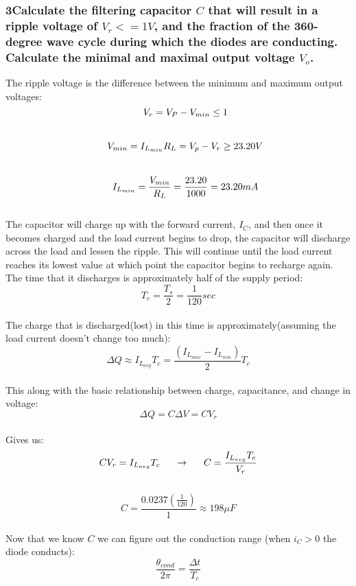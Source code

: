 \documentclass[]{article}
\begin{document}
{	\subsubsection*{3\indent Calculate the filtering capacitor $C$ that will result in a ripple voltage of $V_r <= 1V$, and the fraction of the 360-degree wave cycle during which the diodes are conducting. Calculate the minimal and maximal output voltage $V_o$.}
	{
		The ripple voltage is the difference between the minimum and maximum output voltages:
		\begin{equation} 
			\indent V_r = V_P - V_{min} \le  1
		\end{equation}
		\\
		\begin{equation} 
			\indent V_{min} = I_{L_{min}}R_L = V_p - V_r \ge 23.20V
		\end{equation}
		\\
		\begin{equation} 
			\indent I_{L_{min}} = \frac{V_{min}}{R_L} = \frac{23.20}{1000} = 23.20mA
		\end{equation}
		\\
		The capacitor will charge up with the forward current, $I_C$, and then once it becomes charged and the load current begins to drop, the capacitor will discharge across the load and lessen the ripple. This will continue until the load current reaches its lowest value at which point the capacitor begins to recharge again. The time that it discharges is approximately half of the supply period:
		\begin{equation}
			T_c = \frac{T_s}{2} = \frac{1}{120}sec
		\end{equation}
		\\
		The charge that is discharged(lost) in this time is approximately(assuming the load current doesn't change too much):
			\[ \Delta Q \approx I_{L_{avg}}T_c = \frac{(I_{L_{max}}-I_{L_{min}})}{2}T_c \]
		\\
		This along with the basic relationship between charge, capacitance, and change in voltage:
			\[ \Delta Q = C \Delta V = CV_r \]
		\\
		Gives us:
			\[ CV_r = I_{L_{avg}}T_c \indent\rightarrow\indent C = \frac{I_{L_{avg}}T_c}{V_r} \]
			\\
			\[ C = \frac{0.0237(\frac{1}{120})}{1} \approx 198\mu F \]
		\\
		Now that we know $C$ we can figure out the conduction range (when $i_C > 0$ the diode conducts):
			\[ \frac{\theta_{cond}}{2\pi} = \frac{\Delta t}{T_c}\]
	}
	\\
}
\end{document}
